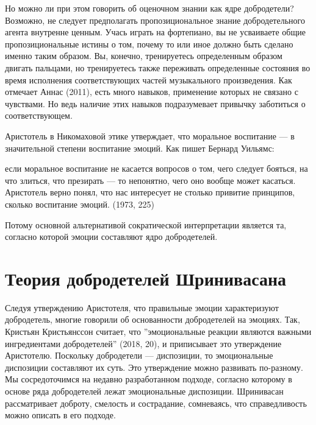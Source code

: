 \documentclass[11pt]{book}
\begin{document}
Но можно ли при этом говорить об оценочном знании как ядре добродетели? Возможно, не следует предполагать пропозициональное знание добродетельного агента внутренне ценным. Учась играть на фортепиано, вы не усваиваете общие пропозициональные истины о том, почему то или иное должно быть сделано именно таким образом. Вы, конечно, тренируетесь определенным образом двигать пальцами, но тренируетесь также переживать определенные состояния во время исполнения соответствующих частей музыкального произведения. Как отмечает Аннас (2011), есть много навыков, применение которых не связано с чувствами. Но ведь наличие этих навыков подразумевает привычку заботиться о соответствующем.

Аристотель в Никомаховой этике утверждает, что моральное воспитание --- в значительной степени воспитание эмоций. Как пишет Бернард Уильямс:

\smallskip

если моральное воспитание не касается вопросов о том, чего следует бояться, на что злиться, что презирать --- то непонятно, чего оно вообще может касаться. Аристотель верно понял, что нас интересует не столько привитие принципов, сколько воспитание эмоций. (1973, 225)

\smallskip

Потому основной альтернативой сократической интерпретации является та, согласно которой эмоции составляют ядро добродетелей.

\section{Теория добродетелей Шринивасана}

Следуя утверждению Аристотеля, что правильные эмоции характеризуют добродетель, многие говорили об основанности добродетелей на эмоциях. Так, Кристьян Кристьянссон считает, что ''эмоциональные реакции являются важными ингредиентами добродетелей'' (2018, 20), и приписывает это утверждение Аристотелю. Поскольку добродетели --- диспозиции, то эмоциональные диспозиции составляют их суть. Это утверждение можно развивать по-разному. Мы сосредоточимся на недавно разработанном подходе, согласно которому в основе ряда добродетелей лежат эмоциональные диспозиции. Шринивасан рассматривает доброту, смелость и сострадание, сомневаясь, что справедливость можно описать в его подходе.
\end{document}
